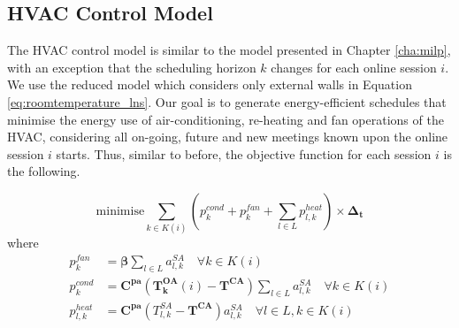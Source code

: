   
\subsection{HVAC Control Model} \label{sec:online_hvac_model}

The HVAC control model is similar to the model presented in Chapter \ref{cha:milp}, with an exception that the scheduling horizon $k$ changes for each online session $i$. We use the reduced model which considers only external walls in Equation \eqref{eq:roomtemperature_lns}. Our goal is to generate energy-efficient schedules that minimise the energy use of air-conditioning, re-heating and fan operations of the HVAC, considering all on-going, future and new meetings known upon the online session $i$ starts. Thus, similar to before, the objective function for each session $i$ is the following.

\begin{equation} 
\mbox{minimise} \sum_{k\in K(i)}  \left( p_{k}^{cond} + p_{k}^{fan} + \sum_{l \in L} p_{l,k}^{heat}\right) \times \bm{\Delta_t}
\end{equation}
where
\begin{align}
p_{k}^{fan} &= \bm{\beta} \sum_{l \in L} a_{l,k}^{SA} \quad  \forall k \in K(i) \label{eq:online:p_fan} \\
p_{k}^{cond} &= \bm{C^{pa}}\left(\bm{T_{k}^{OA}}(i) - \bm{T^{CA}}\right) \sum_{l \in L}  a_{l,k}^{SA} \quad \forall k \in K(i) \label{eq:online:p_cond} \\
p_{l,k}^{heat} &= \bm{C^{pa}} (T_{l,k}^{SA}- \bm{T^{CA}}) a_{l,k}^{SA} \quad \forall l \in L,k \in K(i) \label{eq:online:p_heat}
\end{align}

